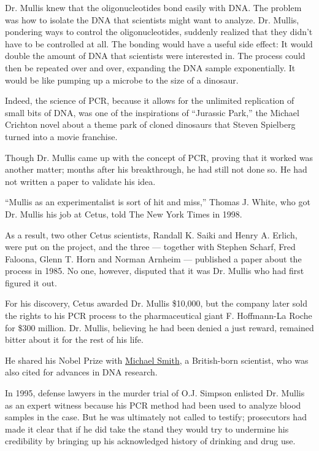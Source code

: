 Dr. Mullis knew that the oligonucleotides bond easily with DNA. The
problem was how to isolate the DNA that scientists might want to
analyze. Dr. Mullis, pondering ways to control the oligonucleotides,
suddenly realized that they didn't have to be controlled at all. The
bonding would have a useful side effect: It would double the amount of
DNA that scientists were interested in. The process could then be
repeated over and over, expanding the DNA sample exponentially. It would
be like pumping up a microbe to the size of a dinosaur.

Indeed, the science of PCR, because it allows for the unlimited
replication of small bits of DNA, was one of the inspirations of
``Jurassic Park,'' the Michael Crichton novel about a theme park of
cloned dinosaurs that Steven Spielberg turned into a movie franchise.

Though Dr. Mullis came up with the concept of PCR, proving that it
worked was another matter; months after his breakthrough, he had still
not done so. He had not written a paper to validate his idea.

``Mullis as an experimentalist is sort of hit and miss,'' Thomas J.
White, who got Dr. Mullis his job at Cetus, told The New York Times in
1998.

As a result, two other Cetus scientists, Randall K. Saiki and Henry A.
Erlich, were put on the project, and the three --- together with Stephen
Scharf, Fred Faloona, Glenn T. Horn and Norman Arnheim --- published a
paper about the process in 1985. No one, however, disputed that it was
Dr. Mullis who had first figured it out.

For his discovery, Cetus awarded Dr. Mullis \$10,000, but the company
later sold the rights to his PCR process to the pharmaceutical giant F.
Hoffmann-La Roche for \$300 million. Dr. Mullis, believing he had been
denied a just reward, remained bitter about it for the rest of his life.

He shared his Nobel Prize with
\href{https://www.nobelprize.org/prizes/chemistry/1993/smith/facts/}{Michael
Smith}, a British-born scientist, who was also cited for advances in DNA
research.

In 1995, defense lawyers in the murder trial of O.J. Simpson enlisted
Dr. Mullis as an expert witness because his PCR method had been used to
analyze blood samples in the case. But he was ultimately not called to
testify; prosecutors had made it clear that if he did take the stand
they would try to undermine his credibility by bringing up his
acknowledged history of drinking and drug use.

